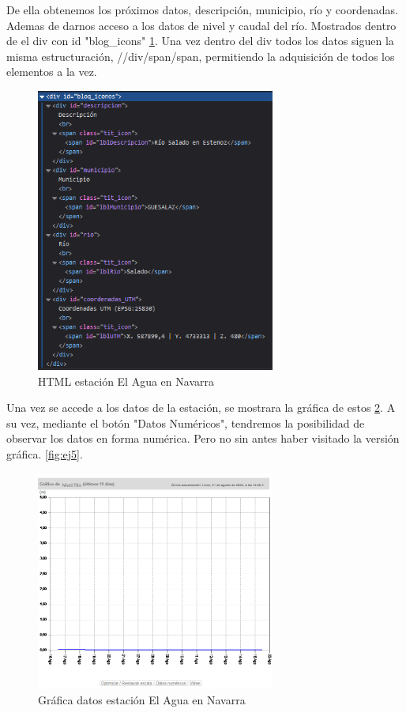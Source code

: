 De ella obtenemos los próximos datos, descripción, municipio, río y coordenadas. Ademas de darnos acceso a los datos de nivel y caudal del río. Mostrados dentro de el div con id "blog\_icons" \ref{fig:ej24}. Una vez dentro del div todos los datos siguen la misma estructuración, //div/span/span, permitiendo la adquisición de todos los elementos a la vez.

\begin{figure} [H]
	\centering
	\includegraphics[width=0.7\textwidth]{fig/AguaEnNavarraEstacionHTML.png}
	\caption[HTML estación de El Agua en Navarra]{HTML estación El Agua en Navarra}
	\label{fig:ej24}
\end{figure}

Una vez se accede a los datos de la estación, se mostrara la gráfica de estos \ref{fig:ej25}. A su vez, mediante el botón "Datos Numéricos", tendremos la posibilidad de observar los datos en forma numérica. Pero no sin antes haber visitado la versión gráfica. \ref{fig:ej5}.

\begin{figure} [H]
	\centering
	\includegraphics[width=0.7\textwidth]{fig/AguaEnNavarraGrafica.png}
	\caption[Gráfica de datos en estación de El Agua en Navarra]{Gráfica datos estación El Agua en Navarra}
	\label{fig:ej25}
\end{figure}

